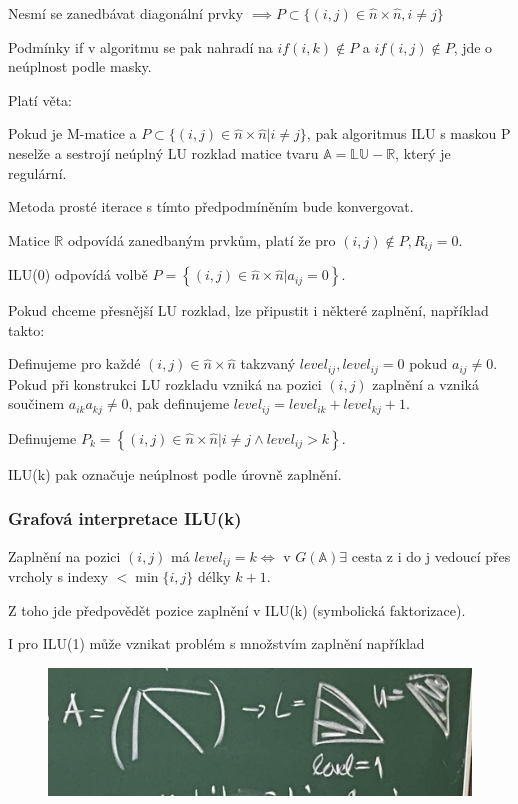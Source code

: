 \documentclass[../main.tex]{subfiles}
\begin{document}
Nesmí se zanedbávat diagonální prvky $\implies P \subset \{(i,j)\in \hat{n} \times \hat{n}, i\neq j \}$

Podmínky if v algoritmu se pak nahradí na $if(i,k)\notin P$ a $if(i,j)\notin P$, jde o neúplnost podle masky.

Platí věta:
\begin{theorem}
    Pokud \matA je M-matice a $P\subset\{(i,j)\in \hat{n} \times \hat{n}| i\neq j\}$, pak algoritmus ILU s maskou P neselže
    a sestrojí neúplný LU rozklad matice \matA tvaru $\mathbb{A} = \mathbb{L} \mathbb{U} - \mathbb{R}$, který je regulární.
    
    Metoda prosté iterace s tímto předpodmíněním bude konvergovat.
\end{theorem}

Matice $\mathbb{R}$ odpovídá zanedbaným prvkům, platí že pro $(i,j)\notin P, R_{ij} = 0$.

ILU(0) odpovídá volbě $  P = \left\{ (i,j) \in \hat{n} \times \hat{n} | a_{ij} = 0 \right\}$.

Pokud chceme přesnější LU rozklad, lze připustit i některé zaplnění, například takto:

Definujeme pro každé $(i,j)\in \hat{n} \times \hat{n} $ takzvaný $level_{ij}, level_{ij}=0$ pokud $a_{ij} \neq 0$.
Pokud při konstrukci LU rozkladu vzniká na pozici $(i,j)$ zaplnění a vzniká součinem $a_{ik} a_{kj} \neq 0$, pak definujeme
$level_{ij} = level_{ik} + level_{kj} + 1$. 

Definujeme $  P_k = \left\{ (i,j) \in \hat{n} \times \hat{n} | i\neq j \wedge level_{ij} > k \right\}$.

ILU(k) pak označuje neúplnost podle úrovně zaplnění. 


\subsubsection{Grafová interpretace ILU(k)}

Zaplnění na pozici $(i,j)$ má $level_{ij} = k \Leftrightarrow$ v $G(\mathbb{A}) \exists$ cesta z i do j vedoucí přes vrcholy s indexy $< \min\{i,j\}$ délky $k+1$.

Z toho jde předpovědět pozice zaplnění v ILU(k) (symbolická faktorizace).

\begin{remark}
    I pro ILU(1) může vznikat problém s množstvím zaplnění například


    \begin{figure}[H]
        \centering
        \includegraphics{images/30-11-ILU1.jpg}
    \end{figure}

\end{remark}
\end{document}
